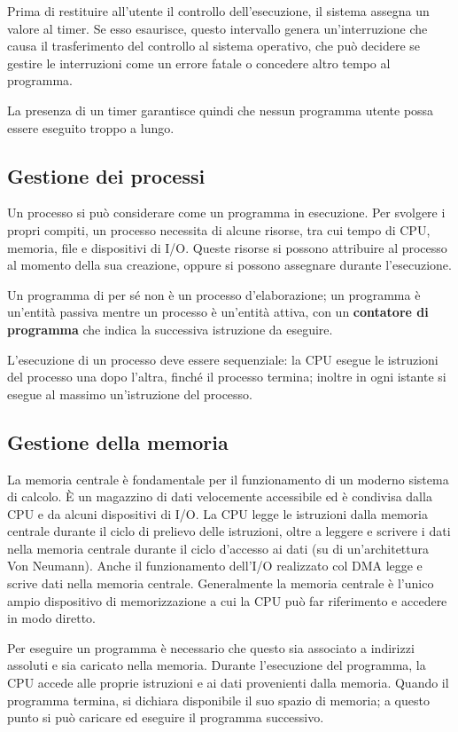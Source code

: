 \documentclass[11pt,a4paper]{article}
\begin{document}
Prima di restituire all'utente il controllo dell'esecuzione, il sistema assegna un valore al
timer. Se esso esaurisce, questo intervallo genera un'interruzione che causa il trasferimento
del controllo al sistema operativo, che può decidere se gestire le interruzioni come un erro­re fatale o concedere altro tempo al programma.

La presenza di un timer garantisce quindi che nessun programma utente possa essere
eseguito troppo a lungo.

\subsection{Gestione dei processi}
Un processo si può considerare come un programma in esecuzione.
Per svolgere i propri compiti, un processo necessita di alcune risorse, tra cui tempo di
CPU, memoria, file e dispositivi di I/O. Queste risorse si possono attribuire al processo al
momento della sua creazione, oppure si possono assegnare durante l'esecuzione.

Un programma di per sé non è un processo d'elaborazione; un programma è un'entità passiva
mentre un processo è un'entità attiva, con un \textbf{contatore di programma} che indica la successiva istruzione da eseguire.

L'esecuzione di un processo deve essere sequenziale: la
CPU esegue le istruzioni del processo una dopo l'altra, finché il processo termina; inoltre in
ogni istante si esegue al massimo un'istruzione del processo.

\subsection{Gestione della memoria}
La memoria centrale è fondamentale per il funzio­namento di un moderno sistema di calcolo. È un magazzino di dati velocemente accessibile ed è condivisa dalla CPU e da
alcuni dispositivi di I/O. La CPU legge le istruzioni dalla memoria centrale durante il ciclo di
prelievo delle istruzioni, oltre a leggere e scrivere i dati nella memoria centrale durante il ciclo
d'accesso ai dati (su di un'architettura Von Neumann). Anche il funzionamento dell'I/O rea­lizzato col DMA legge e scrive dati nella memoria centrale. Generalmente la memoria centra­le è l'unico ampio dispositivo di memorizzazione a cui la CPU può far riferimento e accedere
in modo diretto.

Per eseguire un programma è necessario che questo sia associato a indirizzi assoluti e
sia caricato nella memoria. Durante l'esecuzione del programma, la CPU accede alle proprie
istruzioni e ai dati provenienti dalla memoria. Quan­do il programma termina, si dichiara disponibile il suo spazio di memoria; a questo punto si può caricare ed eseguire il programma successivo.
\end{document}
